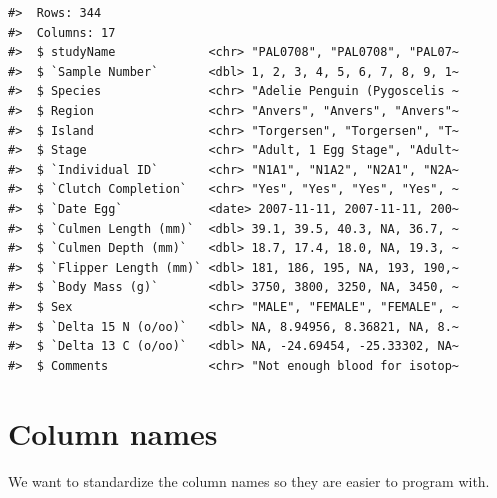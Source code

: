 \documentclass[letterpaper,9pt,twoside,]{pinp}
\begin{document}
\begin{ShadedResult}
\begin{verbatim}
#>  Rows: 344
#>  Columns: 17
#>  $ studyName             <chr> "PAL0708", "PAL0708", "PAL07~
#>  $ `Sample Number`       <dbl> 1, 2, 3, 4, 5, 6, 7, 8, 9, 1~
#>  $ Species               <chr> "Adelie Penguin (Pygoscelis ~
#>  $ Region                <chr> "Anvers", "Anvers", "Anvers"~
#>  $ Island                <chr> "Torgersen", "Torgersen", "T~
#>  $ Stage                 <chr> "Adult, 1 Egg Stage", "Adult~
#>  $ `Individual ID`       <chr> "N1A1", "N1A2", "N2A1", "N2A~
#>  $ `Clutch Completion`   <chr> "Yes", "Yes", "Yes", "Yes", ~
#>  $ `Date Egg`            <date> 2007-11-11, 2007-11-11, 200~
#>  $ `Culmen Length (mm)`  <dbl> 39.1, 39.5, 40.3, NA, 36.7, ~
#>  $ `Culmen Depth (mm)`   <dbl> 18.7, 17.4, 18.0, NA, 19.3, ~
#>  $ `Flipper Length (mm)` <dbl> 181, 186, 195, NA, 193, 190,~
#>  $ `Body Mass (g)`       <dbl> 3750, 3800, 3250, NA, 3450, ~
#>  $ Sex                   <chr> "MALE", "FEMALE", "FEMALE", ~
#>  $ `Delta 15 N (o/oo)`   <dbl> NA, 8.94956, 8.36821, NA, 8.~
#>  $ `Delta 13 C (o/oo)`   <dbl> NA, -24.69454, -25.33302, NA~
#>  $ Comments              <chr> "Not enough blood for isotop~
\end{verbatim}
\end{ShadedResult}

\hypertarget{column-names}{%
\section{Column names}\label{column-names}}

We want to standardize the column names so they are easier to program
with.

\begin{Shaded}
\begin{Highlighting}[]
\OtherTok{\textless{}{-}}\SpecialCharTok{\%\textgreater{}\%}\SpecialCharTok{::}\NormalTok{()}
\end{Highlighting}
\end{Shaded}
\end{document}
